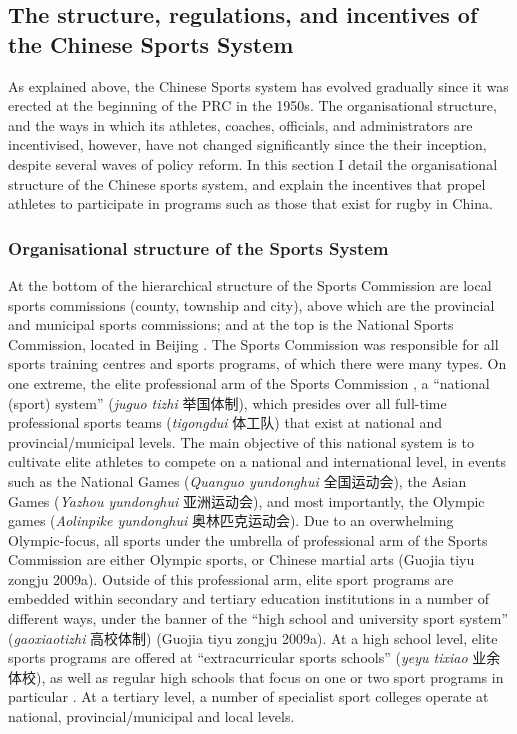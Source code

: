 \begin{CJK}{UTF8}{gbsn}
\section{The structure, regulations, and incentives of the Chinese Sports System}

As explained above, the Chinese Sports system has evolved gradually since it was erected at the beginning of the PRC in the 1950s. The organisational structure, and the ways in which its athletes, coaches, officials, and administrators are incentivised, however, have not changed significantly since the their inception, despite several waves of policy reform.  In this section I detail the organisational structure of the Chinese sports system, and explain the incentives that propel athletes to participate in programs such as those that exist for rugby in China.

\subsubsection{Organisational structure of the Sports System}
At the bottom of the hierarchical structure of the Sports Commission are local sports commissions (county, township and city), above which are the provincial and municipal sports commissions; and at the top is the National Sports Commission, located in Beijing \citep[59]{Brownell1995}.  The Sports Commission was responsible for all sports training centres and sports programs, of which there were many types.  On one extreme, the elite professional arm of the Sports Commission , a ``national (sport) system'' (\textit{juguo tizhi} 举国体制), which presides over all full-time professional sports teams (\textit{tigongdui} 体工队) that exist at national and provincial/municipal levels.  The main objective of this national system is to cultivate elite athletes to compete on a national and international level, in events such as the National Games (\textit{Quanguo yundonghui} 全国运动会), the Asian Games (\textit{Yazhou yundonghui} 亚洲运动会), and most importantly, the Olympic games (\textit{Aolinpike yundonghui} 奥林匹克运动会).  Due to an overwhelming Olympic-focus, all sports under the umbrella of professional arm of the Sports Commission are either Olympic sports, or Chinese martial arts (Guojia tiyu zongju 2009a).  Outside of this professional arm, elite sport programs are embedded within secondary and tertiary education institutions in a number of different ways, under the banner of the ``high school and university sport system'' (\textit{gaoxiaotizhi} 高校体制) (Guojia tiyu zongju 2009a).  At a high school level, elite sports programs are offered at ``extracurricular sports schools'' (\textit{yeyu tixiao} 业余体校), as well as regular high schools that focus on one or two sport programs in particular \citep[59]{Brownell1995}. At a tertiary level, a number of specialist sport colleges operate at national, provincial/municipal and local levels.


\end{CJK}
